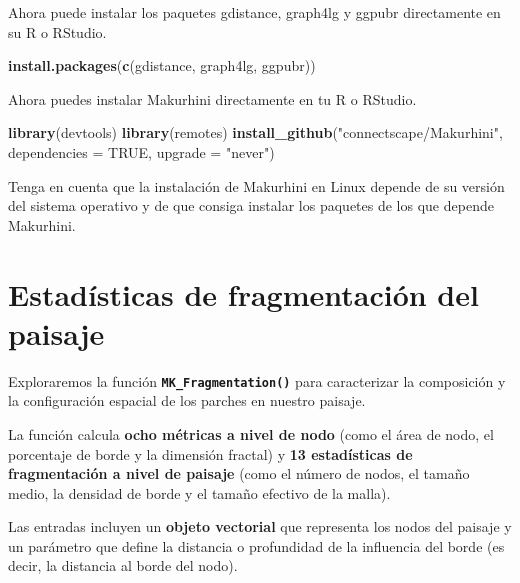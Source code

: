 \documentclass[
]{book}
\newenvironment{Shaded}{\begin{snugshade}}{\end{snugshade}}
\newcommand{\AttributeTok}[1]{\textcolor[rgb]{0.13,0.29,0.53}{#1}}
\newcommand{\ConstantTok}[1]{\textcolor[rgb]{0.56,0.35,0.01}{#1}}
\newcommand{\FunctionTok}[1]{\textcolor[rgb]{0.13,0.29,0.53}{\textbf{#1}}}
\newcommand{\NormalTok}[1]{#1}
\newcommand{\StringTok}[1]{\textcolor[rgb]{0.31,0.60,0.02}{#1}}
\begin{document}
Ahora puede instalar los paquetes gdistance, graph4lg y ggpubr
directamente en su R o RStudio.

\begin{Shaded}
\begin{Highlighting}[]
\FunctionTok{install.packages}\NormalTok{(}\FunctionTok{c}\NormalTok{(}\StringTok{\textquotesingle{}gdistance\textquotesingle{}}\NormalTok{, }\StringTok{\textquotesingle{}graph4lg\textquotesingle{}}\NormalTok{, }\StringTok{\textquotesingle{}ggpubr\textquotesingle{}}\NormalTok{))}
\end{Highlighting}
\end{Shaded}

Ahora puedes instalar Makurhini directamente en tu R o RStudio.

\begin{Shaded}
\begin{Highlighting}[]
\FunctionTok{library}\NormalTok{(devtools) }
\FunctionTok{library}\NormalTok{(remotes) }
\FunctionTok{install\_github}\NormalTok{(}\StringTok{"connectscape/Makurhini"}\NormalTok{, }\AttributeTok{dependencies =} \ConstantTok{TRUE}\NormalTok{, }\AttributeTok{upgrade =} \StringTok{"never"}\NormalTok{) }
\end{Highlighting}
\end{Shaded}

Tenga en cuenta que la instalación de Makurhini en Linux depende de su
versión del sistema operativo y de que consiga instalar los paquetes de
los que depende Makurhini.

\chapter{Estadísticas de fragmentación del paisaje}\label{estaduxedsticas-de-fragmentaciuxf3n-del-paisaje}

Exploraremos la función \textbf{\texttt{MK\_Fragmentation()}} para caracterizar la composición y la configuración espacial de los parches en nuestro paisaje.

La función calcula \textbf{ocho métricas a nivel de nodo} (como el área de nodo, el porcentaje de borde y la dimensión fractal) y \textbf{13 estadísticas de fragmentación a nivel de paisaje} (como el número de nodos, el tamaño medio, la densidad de borde y el tamaño efectivo de la malla).

Las entradas incluyen un \textbf{objeto vectorial} que representa los nodos del paisaje y un parámetro que define la distancia o profundidad de la influencia del borde (es decir, la distancia al borde del nodo).
\end{document}
